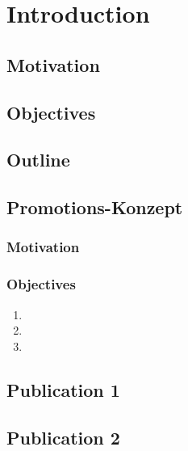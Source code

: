 \chapter{Introduction}



\blindtext


\section{Motivation}

\blindtext
\blindtext


\section{Objectives}

\blindtext
\blindtext

\section{Outline}

\blindtext
\blindtext


\section*{Promotions-Konzept}
\subsection*{Motivation}
\blindtext


\subsection*{Objectives}

\begin{enumerate}
	\item \blindtext
	
	\item \blindtext
	
	\item \blindtext
\end{enumerate}






\section*{Publication 1}
\blindtext


\section*{Publication 2}
\blindtext


